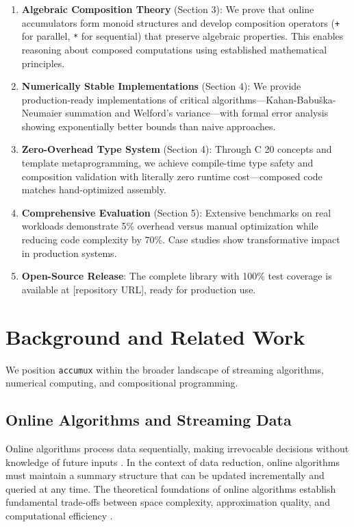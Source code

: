 \documentclass[sigconf]{acmart}
\newcommand{\accumux}{\texttt{accumux}\xspace}
\newcommand{\cpp}{C\nolinebreak\hspace{-.05em}\raisebox{.4ex}{\tiny\bf +}\nolinebreak\hspace{-.10em}\raisebox{.4ex}{\tiny\bf +}\xspace}
\begin{document}
\begin{enumerate}
\item \textbf{Algebraic Composition Theory} (Section 3): We prove that online accumulators form monoid structures and develop composition operators (\texttt{+} for parallel, \texttt{*} for sequential) that preserve algebraic properties. This enables reasoning about composed computations using established mathematical principles.

\item \textbf{Numerically Stable Implementations} (Section 4): We provide production-ready implementations of critical algorithms---Kahan-Babuška-Neumaier summation and Welford's variance---with formal error analysis showing exponentially better bounds than naive approaches.

\item \textbf{Zero-Overhead Type System} (Section 4): Through \cpp20 concepts and template metaprogramming, we achieve compile-time type safety and composition validation with literally zero runtime cost---composed code matches hand-optimized assembly.

\item \textbf{Comprehensive Evaluation} (Section 5): Extensive benchmarks on real workloads demonstrate 5\% overhead versus manual optimization while reducing code complexity by 70\%. Case studies show transformative impact in production systems.

\item \textbf{Open-Source Release}: The complete library with 100\% test coverage is available at [repository URL], ready for production use.
\end{enumerate}

\section{Background and Related Work}

We position \accumux within the broader landscape of streaming algorithms, numerical computing, and compositional programming.

\subsection{Online Algorithms and Streaming Data}

Online algorithms process data sequentially, making irrevocable decisions without knowledge of future inputs \cite{borodin2005online}. In the context of data reduction, online algorithms must maintain a summary structure that can be updated incrementally and queried at any time. The theoretical foundations of online algorithms establish fundamental trade-offs between space complexity, approximation quality, and computational efficiency \cite{muthukrishnan2005data}.
\end{document}
